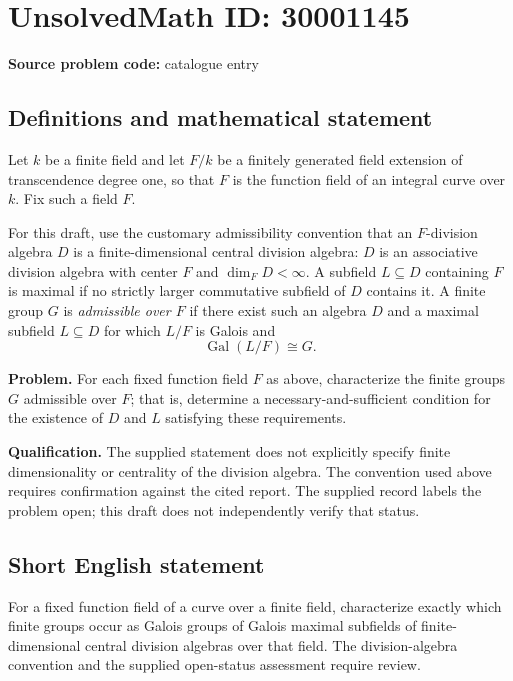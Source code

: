\documentclass[11pt]{article}
\begin{document}
\section*{UnsolvedMath ID: 30001145}
\textbf{Source problem code:} catalogue entry
\subsection{Definitions and mathematical statement}
Let \(k\) be a finite field and let \(F/k\) be a finitely generated field extension of transcendence degree one, so that \(F\) is the function field of an integral curve over \(k\). Fix such a field \(F\).

For this draft, use the customary admissibility convention that an \(F\)-division algebra \(D\) is a finite-dimensional central division algebra: \(D\) is an associative division algebra with center \(F\) and \(\dim_F D<\infty\). A subfield \(L\subseteq D\) containing \(F\) is maximal if no strictly larger commutative subfield of \(D\) contains it. A finite group \(G\) is \emph{admissible over \(F\)} if there exist such an algebra \(D\) and a maximal subfield \(L\subseteq D\) for which \(L/F\) is Galois and
\[
\operatorname{Gal}(L/F)\cong G.
\]

\textbf{Problem.} For each fixed function field \(F\) as above, characterize the finite groups \(G\) admissible over \(F\); that is, determine a necessary-and-sufficient condition for the existence of \(D\) and \(L\) satisfying these requirements.

\textbf{Qualification.} The supplied statement does not explicitly specify finite dimensionality or centrality of the division algebra. The convention used above requires confirmation against the cited report. The supplied record labels the problem open; this draft does not independently verify that status.
\subsection{Short English statement}
For a fixed function field of a curve over a finite field, characterize exactly which finite groups occur as Galois groups of Galois maximal subfields of finite-dimensional central division algebras over that field. The division-algebra convention and the supplied open-status assessment require review.
\end{document}
